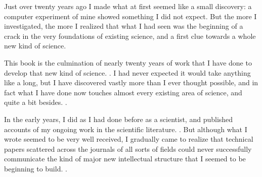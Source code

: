 
Just over twenty years ago I made what at first seemed like a small
discovery: a computer experiment of mine showed something I did not expect.
But the more I investigated, the more I realized that what I had seen was the
beginning of a crack in the very foundations of existing science, and a first
clue towards a whole new kind of science. 

This book is the culmination of nearly twenty years of work that
I have done to develop that new kind of science.
.
I had never expected it
would take anything like a long, but I have discovered vastly more
than I ever thought possible, and in fact what I have done now touches
almost every existing area of science, and quite a bit besides.
.

In the early years, I did as I had done before as a scientist, and
published accounts of my ongoing work in the scientific literature.
.
But
although what I wrote seemed to be very well received, I gradually came
to realize that technical papers scattered across the journals of all sorts of
fields could never successfully communicate the kind of major new
intellectual structure that I seemed to be beginning to build.
.



